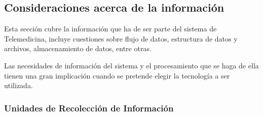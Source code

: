 \subsection{Consideraciones acerca de la información}

Esta sección cubre la información que ha de ser parte del sistema de Telemedicina, incluye cuestiones sobre flujo de datos, estructura de datos y archivos, almacenamiento de datos, entre otras. 

Las necesidades de información del sistema y el procesamiento que se haga de ella tienen una gran implicación cuando se pretende elegir la tecnología a ser utilizada.

\subsubsection{Unidades de Recolección de Información}

